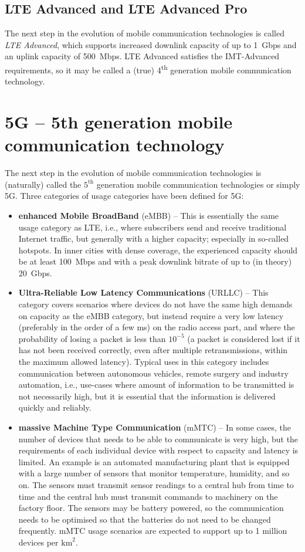 \subsection{LTE Advanced and LTE Advanced Pro}
The next step in the evolution of mobile communication technologies is called \emph{LTE Advanced}, which supports increased downlink capacity of up to 1~Gbps and an uplink capacity of 500~Mbps. LTE Advanced satisfies the IMT-Advanced requirements, so it may be called a (true) 4\textsuperscript{th} generation mobile communication technology.

\section{5G -- 5th generation mobile communication technology}
The next step in the evolution of mobile communication technologies is (naturally) called the $5^{\textrm{th}}$ generation mobile communication technologies or simply 5G. Three categories of usage categories have been defined for 5G:
\begin{itemize}
%
\item \textbf{enhanced Mobile BroadBand} (eMBB) -- This is essentially the same usage category as LTE, i.e., where subscribers send and receive traditional Internet traffic, but generally with a higher capacity; especially in so-called hotspots. In inner cities with dense coverage, the experienced capacity should be at least 100~Mbps and with a peak downlink bitrate of up to (in theory) 20~Gbps.
%
\item \textbf{Ultra-Reliable Low Latency Communications} (URLLC) -- This category covers scenarios where devices do not have the same high demands on capacity as the eMBB category, but instead require a very low latency (preferably in the order of a few ms) on the radio access part, and where the probability of losing a packet is less than $10^{-5}$ (a packet is considered lost if it has not been received correctly, even after multiple retransmissions, within the maximum allowed latency). Typical uses in this category includes communication between autonomous vehicles, remote surgery and industry automation, i.e., use-cases where amount of information to be transmitted is not necessarily high, but it is essential that the information is delivered quickly and reliably.
%
\item \textbf{massive Machine Type Communication} (mMTC) -- In some cases, the number of devices that needs to be able to communicate is very high, but the requirements of each individual device with respect to capacity and latency is limited. An example is an automated manufacturing plant that is equipped with a large number of sensors that monitor temperature, humidity, and so on. The sensors must transmit sensor readings to a central hub from time to time and the central hub must transmit commands to machinery on the factory floor. The sensors may be battery powered, so the communication needs to be optimised so that the batteries do not need to be changed frequently. mMTC usage scenarios are expected to support up to 1 million devices per $\textrm{km}^2$.
%
\end{itemize}

